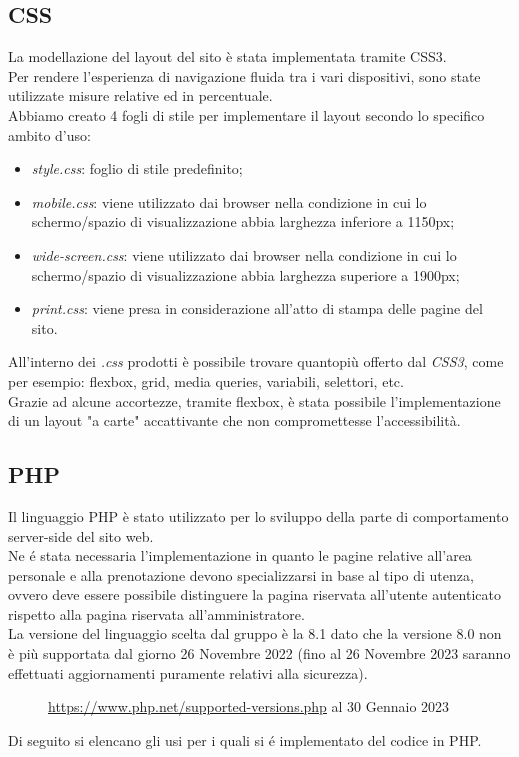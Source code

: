 \documentclass[]{article}
\begin{document}
\subsection{CSS}
La modellazione del layout del sito è stata implementata tramite CSS3.\\
Per rendere l'esperienza di navigazione fluida tra i vari dispositivi, sono state utilizzate misure relative ed in percentuale.\\
Abbiamo creato 4 fogli di stile per implementare il layout secondo lo specifico ambito d'uso:
\begin{itemize}
	\item \textit{style.css}: foglio di stile predefinito;
	\item \textit{mobile.css}: viene utilizzato dai browser nella condizione in cui lo schermo/spazio di visualizzazione abbia larghezza inferiore a 1150px;
	\item \textit{wide-screen.css}: viene utilizzato dai browser nella condizione in cui lo schermo/spazio di visualizzazione abbia larghezza superiore a 1900px;
	\item \textit{print.css}: viene presa in considerazione all'atto di stampa delle pagine del sito.
\end{itemize}
All'interno dei \textit{.css} prodotti è possibile trovare quantopiù offerto dal \textit{CSS3}, come per esempio: flexbox, grid, media queries, variabili, selettori, etc.\\
Grazie ad alcune accortezze, tramite flexbox, è stata possibile l'implementazione di un layout  "a carte" accattivante che non compromettesse l'accessibilità.

\subsection{PHP} %
Il linguaggio PHP è stato utilizzato per lo sviluppo della parte di comportamento server-side del sito web. \\
Ne é stata necessaria l'implementazione in quanto le pagine relative all'area personale e alla prenotazione devono specializzarsi in base al tipo di utenza, ovvero deve essere possibile distinguere la pagina riservata all'utente autenticato rispetto alla pagina riservata all'amministratore.\\
La versione del linguaggio scelta dal gruppo è la 8.1 dato che la versione 8.0 non è più supportata dal giorno 26 Novembre 2022 (fino al 26 Novembre 2023 saranno effettuati aggiornamenti puramente relativi alla sicurezza).
\begin{figure}[H]
	\centering
	\caption{\href{https://www.php.net/supported-versions.php}{https://www.php.net/supported-versions.php} al 30 Gennaio 2023}
\end{figure}
Di seguito si elencano gli usi per i quali si é implementato del codice in PHP.
\end{document}
